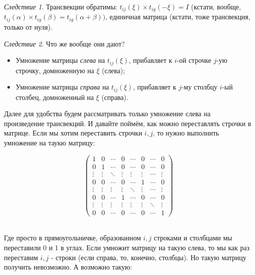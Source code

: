 \documentclass[a4paper,100pt]{article}
\theoremstyle{indented}
\theoremstyle{definition}
\theoremstyle{remark}
\newtheorem{cons}{Следствие}
\begin{document}
\begin{cons}
    Трансвекции обратимы: $t_{ij}(\xi)\times t_{ig}(-\xi)=I$ (кстати, вообще, $t_{ij}(\alpha)\times t_{ig}(\beta)=t_{ig}(\alpha+\beta))$, единичная матрица (кстати, тоже трансвекция, только от нуля).
\end{cons}

\begin{cons} Что же вообще они дают? \
    \begin{itemize}
    \item Умножение матрицы \textit{слева} на $t_{ij}(\xi)$, прибавляет к $i$-ой строчке $j$-ую строчку, домноженную на $\xi$ (слева);
    \item Умножение матрицы \textit{справа} на $t_{ij}(\xi)$, прибавляет к $j$-му столбцу $i$-ый столбец, домноженный на $\xi$ (справа).
    \end{itemize}
\end{cons}

Далее для удобства будем рассматривать только умножение слева на произведение трансвекций. И давайте поймём, как можно переставлять строчки в матрице. Если мы хотим переставить строчки $i, j$, то нужно выполнить умножение на таукю матрицу:

\begin{equation*}
    \begin{pmatrix}
        1 & 0 & \cdots & 0 & \cdots & 0 & \cdots & 0 \\
        0 & 1 & \cdots & 0 & \cdots & 0 & \cdots & 0 \\
        \vdots & \vdots & \ddots & \vdots & \vdots & \vdots & \cdots & \vdots \\
        0 & 0 & \cdots & 0 & \cdots & 1 & \cdots & 0 \\
        \vdots & \vdots & \vdots & \vdots & \ddots & \vdots & \cdots & \vdots \\
        0 & 0 & \cdots & 1 & \cdots & 0 & \cdots & 0 \\
        \vdots & \vdots & \vdots & \vdots & \vdots & \vdots & \ddots & \vdots \\
        0 & 0 & \cdots & 0 & \cdots & 0 & \cdots & 1
    \end{pmatrix}
\end{equation*}\

Где просто в прямоугольничке, образованном $i, j$ строками и столбцами мы переставили 0 и 1 в углах. Если умножит матрицу на такую слева, то мы как раз переставим $i, j$ - строки (если справа, то, конечно, столбцы). Но такую матрицу получить невозможно. А возможно такую: 
\end{document}
